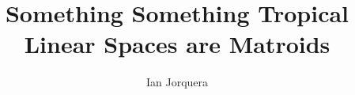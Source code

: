 \documentclass{article}
\title{Something Something Tropical Linear Spaces are Matroids}
\author{Ian Jorquera}
\begin{document}
\maketitle



\nocite{*}


\end{document}
